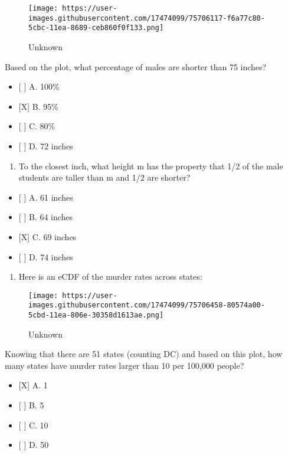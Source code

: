 \documentclass[]{article}
\providecommand{\tightlist}{%
  \setlength{\itemsep}{0pt}\setlength{\parskip}{0pt}}
\begin{document}
\begin{figure}
\centering
\texttt{[image: https://user-images.githubusercontent.com/17474099/75706117-f6a77c80-5cbc-11ea-8689-ceb860f0f133.png]}
\caption{Unknown}
\end{figure}

Based on the plot, what percentage of males are shorter than 75 inches?

\begin{itemize}
\tightlist
\item
  {[} {]} A. 100\%
\item
  {[}X{]} B. 95\%
\item
  {[} {]} C. 80\%
\item
  {[} {]} D. 72 inches
\end{itemize}

\begin{enumerate}
\def\labelenumi{\arabic{enumi}.}
\setcounter{enumi}{3}
\tightlist
\item
  To the closest inch, what height m has the property that 1/2 of the
  male students are taller than m and 1/2 are shorter?
\end{enumerate}

\begin{itemize}
\tightlist
\item
  {[} {]} A. 61 inches
\item
  {[} {]} B. 64 inches
\item
  {[}X{]} C. 69 inches
\item
  {[} {]} D. 74 inches
\end{itemize}

\begin{enumerate}
\def\labelenumi{\arabic{enumi}.}
\setcounter{enumi}{4}
\tightlist
\item
  Here is an eCDF of the murder rates across states:
\end{enumerate}

\begin{figure}
\centering
\texttt{[image: https://user-images.githubusercontent.com/17474099/75706458-80574a00-5cbd-11ea-806e-30358d1613ae.png]}
\caption{Unknown}
\end{figure}

Knowing that there are 51 states (counting DC) and based on this plot,
how many states have murder rates larger than 10 per 100,000 people?

\begin{itemize}
\tightlist
\item
  {[}X{]} A. 1
\item
  {[} {]} B. 5
\item
  {[} {]} C. 10
\item
  {[} {]} D. 50
\end{itemize}
\end{document}
